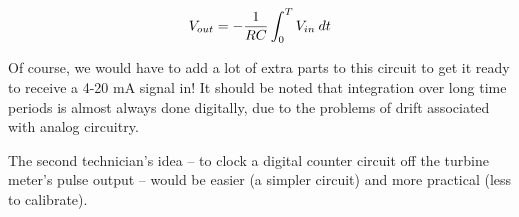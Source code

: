 $$V_{out} = - {1 \over {RC}} \int^T_0 V_{in} \> dt$$

Of course, we would have to add a lot of extra parts to this circuit to get it ready to receive a 4-20 mA signal in!  It should be noted that integration over long time periods is almost always done digitally, due to the problems of drift associated with analog circuitry.

\vskip 10pt

The second technician's idea -- to clock a digital counter circuit off the turbine meter's pulse output -- would be easier (a simpler circuit) and more practical (less to calibrate).











